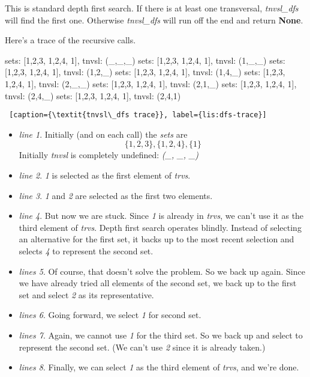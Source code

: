 This is standard depth first search. If there is at least one transversal, \textit{tnvsl\_dfs} will find the first one. Otherwise \textit{tnvsl\_dfs} will run off the end and return \textbf{None}.

Here's a trace of the recursive calls.

\smallv
\begin{minipage}[c]{0.45\textwidth}
\begin{python1}[numbers=left]
sets: [{1,2,3}, {1,2,4}, {1}], tnvsl: (_,_,_)
  sets: [{1,2,3}, {1,2,4}, {1}], tnvsl: (1,_,_)
    sets: [{1,2,3}, {1,2,4}, {1}], tnvsl: (1,2,_)
    sets: [{1,2,3}, {1,2,4}, {1}], tnvsl: (1,4,_)
  sets: [{1,2,3}, {1,2,4}, {1}], tnvsl: (2,_,_)
    sets: [{1,2,3}, {1,2,4}, {1}], tnvsl: (2,1,_)
    sets: [{1,2,3}, {1,2,4}, {1}], tnvsl: (2,4,_)
      sets: [{1,2,3}, {1,2,4}, {1}], tnvsl: (2,4,1)
\end{python1}
\begin{lstlisting} [caption={\textit{tnvsl\_dfs trace}}, label={lis:dfs-trace}]
\end{lstlisting}
\end{minipage}

\begin{itemize}
    \item \textit{line 1}. Initially (and on each call) the \textit{sets} are \[\{1, 2, 3\}, \{1, 2, 4\}, \{1\}\] Initially \textit{tnvsl} is completely undefined: \textit{(\_, \_, \_)}
    \item  \textit{line 2}. \textit{1} is selected as the first element of \textit{trvs}.
    \item  \textit{line 3}. \textit{1}  and \textit{2} are selected as the first two elements.
    \item \textit{line 4}. But now we are stuck. Since \textit{1} is already in \textit{trvs}, we can't use it as the third element of \textit{trvs}. Depth first search operates blindly. Instead of selecting an alternative for the first set, it backs up to the most recent selection and selects \textit{4} to represent the second set. 
    \item \textit{lines 5}. Of course, that doesn't solve the problem. So we back up again. Since we have already tried all elements of the second set, we back up to the first set and select \textit{2} as its representative. 
    \item \textit{lines 6}. Going forward, we select \textit{1} for second set.
    \item \textit{lines 7}. Again, we cannot use \textit{1} for the third set. So we back up and select  to represent the second set. (We can't use \textit{2} since it is already taken.)
    \item \textit{lines 8}. Finally, we can select \textit{1} as the third element of \textit{trvs}, and we're done.
\end{itemize}

